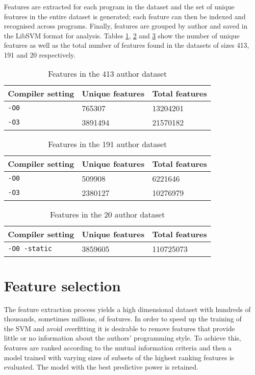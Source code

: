 \documentclass[a4paper,11pt]{kth-mag}
\begin{document}
Features are extracted for each program in the dataset and the set of unique
features in the entire dataset is generated; each feature can then be indexed
and recognised across programs. Finally, features are grouped by author and
saved in the LibSVM format %
for analysis. Tables \ref{tab:413-features},
\ref{tab:191-features} and \ref{tab:20-features} show the number of unique
features as well as the total number of features found in the datasets of sizes
413, 191 and 20 respectively.   

\begin{table}[!htb]
    \centering
        \begin{tabular}{ l l l }
        Compiler setting & Unique features & Total features \\ \hline
        \lstinline{-O0} & 765307 & 13204201 \\
        \lstinline{-O3} & 3891494 & 21570182
        \end{tabular}
    \caption{Features in the 413 author dataset}
    \label{tab:413-features}
\end{table}

\begin{table}[!htb]
    \centering
        \begin{tabular}{ l l l }
        Compiler setting & Unique features & Total features \\ \hline
        \lstinline{-O0} & 509908 & 6221646 \\
        \lstinline{-O3} & 2380127 & 10276979
        \end{tabular}
    \caption{Features in the 191 author dataset}
    \label{tab:191-features}
\end{table}

\begin{table}[!htb]
    \centering
        \begin{tabular}{ l l l }
        Compiler setting & Unique features & Total features \\ \hline
        \lstinline{-O0 -static} & 3859605 & 110725073 \\
        \end{tabular}
    \caption{Features in the 20 author dataset}
    \label{tab:20-features}
\end{table}

\section{Feature selection}
The feature extraction process yields a high dimensional dataset with hundreds
of thousands, sometimes millions, of features. In order to speed up the
training of the SVM and avoid overfitting it is desirable to remove features
that provide little or no information about the authors’ programming style. To
achieve this, features are ranked according to the mutual information
criteria \parencite{guyon2003introduction} and then a model trained
with varying sizes of subsets of the highest ranking features is evaluated. The model with
the best predictive power is retained.
\end{document}
